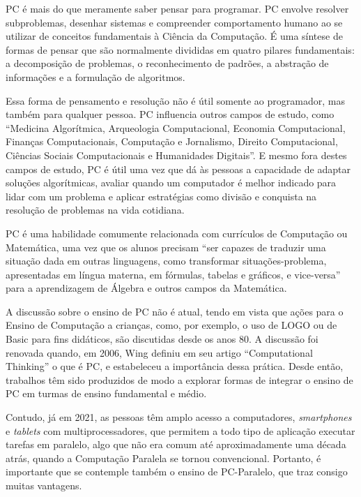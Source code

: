 \documentclass[conference]{IEEEtran}
\begin{document}
PC é mais do que meramente saber pensar para programar. PC envolve resolver subproblemas, desenhar sistemas e compreender comportamento humano ao se utilizar de conceitos fundamentais à Ciência da Computação\cite{wing_computational_2006}. É uma síntese de formas de pensar que são normalmente divididas em quatro pilares fundamentais: a decomposição de problemas, o reconhecimento de padrões, a abstração de informações e a formulação de algoritmos\cite{BBC}.

 Essa forma de pensamento e resolução não é útil somente ao programador, mas também para qualquer pessoa. PC influencia outros campos de estudo, como ``Medicina Algorítmica, Arqueologia Computacional, Economia Computacional, Finanças Computacionais, Computação e Jornalismo, Direito Computacional, Ciências Sociais Computacionais e Humanidades Digitais''\cite{wing_computational_2010}. E mesmo fora destes campos de estudo, PC é útil uma vez que dá às pessoas a capacidade de adaptar soluções algorítmicas, avaliar quando um computador é melhor indicado para lidar com um problema e aplicar estratégias como divisão e conquista na resolução de problemas na vida cotidiana\cite{wing_computational_2010}.

PC é uma habilidade comumente relacionada com currículos de Computação\cite{tch060} ou Matemática, uma vez que os alunos precisam ``ser capazes de traduzir uma situação dada em outras linguagens, como transformar situações-problema, apresentadas em língua materna, em fórmulas, tabelas e gráficos, e vice-versa''\cite{ministerio_da_educacao_base_2018} para a aprendizagem de Álgebra e outros campos da Matemática. 

A discussão sobre o ensino de PC não é atual, tendo em vista que ações para o Ensino de Computação a crianças, como, por exemplo, o uso de LOGO ou de Basic para fins didáticos, são discutidas desde os anos 80\cite{grover_computational_2013}. A discussão foi renovada quando, em 2006, Wing definiu em seu artigo ``Computational Thinking'' o que é PC, e estabeleceu a importância dessa prática. Desde então, trabalhos têm sido produzidos de modo a explorar formas de integrar o ensino de PC em turmas de ensino fundamental e médio\cite{wing_computational_2006}\cite{de_franca_disseminacao_2014}\cite{repenning_computational_2016}\cite{monclar_jogos_nodate}.

Contudo, já em 2021, as pessoas têm amplo acesso a computadores, \textit{smartphones} e \textit{tablets} com multiprocessadores, que permitem a todo tipo de aplicação executar tarefas em paralelo, algo que não era comum até aproximadamente uma década atrás, quando a Computação Paralela se tornou convencional. Portanto, é importante que se contemple também o ensino de PC-Paralelo, que traz consigo muitas vantagens\cite{BBC}.
\end{document}
